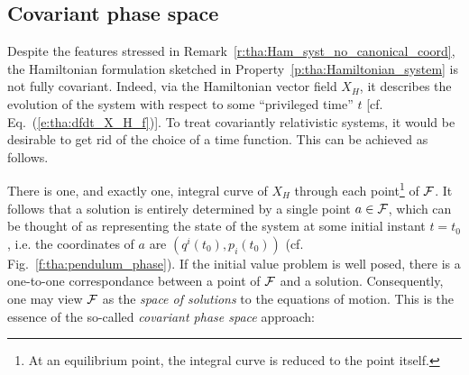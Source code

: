 \subsection{Covariant phase space}

Despite the features stressed in Remark~\ref{r:tha:Ham_syst_no_canonical_coord}, the Hamiltonian formulation sketched in
Property~\ref{p:tha:Hamiltonian_system} is not fully covariant.
Indeed, via the Hamiltonian
vector field $X_H$, it describes the evolution of the system with
respect to some ``privileged time'' $t$ [cf. Eq.~(\ref{e:tha:dfdt_X_H_f})].
To treat covariantly relativistic systems, it would be desirable to get
rid of the choice of a time function. This can be achieved as follows.

There is one, and exactly one,
integral curve of $X_H$ through each point\footnote{At an equilibrium point, the
integral curve is reduced to the point itself.} of $\mathcal{F}$.
It follows that a solution is entirely determined by a single point $a\in\mathcal{F}$,
which can be thought of as representing the state of the system at some initial
instant $t=t_0$, i.e. the coordinates of $a$ are $(q^i(t_0),p_i(t_0))$
(cf. Fig.~\ref{f:tha:pendulum_phase}).
If the initial value problem is well posed, there is a one-to-one
correspondance between a point of $\mathcal{F}$ and a solution.
Consequently, one may view $\mathcal{F}$ as the \emph{space of solutions}
to the equations of motion.
This is the essence of the
so-called \emph{covariant phase space} approach:

